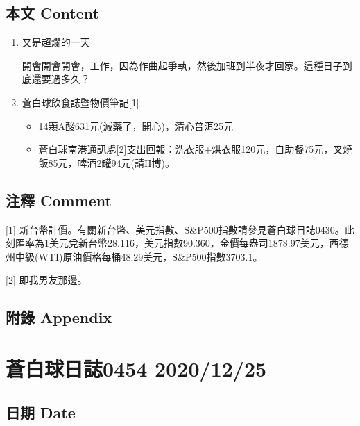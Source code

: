 \documentclass[a5paper, 10pt
]{book}
\providecommand{\tightlist}{%
  \setlength{\itemsep}{0pt}\setlength{\parskip}{0pt}}
\begin{document}
\hypertarget{ux672cux6587-content-23}{%
\subsection{本文 Content}\label{ux672cux6587-content-23}}

\begin{enumerate}
\def\labelenumi{\arabic{enumi}.}
\item
  又是超爛的一天

  開會開會開會，工作，因為作曲起爭執，然後加班到半夜才回家。這種日子到底還要過多久？
\item
  蒼白球飲食誌暨物價筆記{[}1{]}

  \begin{itemize}
  \tightlist
  \item
    14顆A酸631元(減藥了，開心)，清心普洱25元
  \item
    蒼白球南港通訊處{[}2{]}支出回報：洗衣服+烘衣服120元，自助餐75元，叉燒飯85元，啤酒2罐94元(請H博)。
  \end{itemize}
\end{enumerate}

\hypertarget{ux6ce8ux91cb-comment-23}{%
\subsection{注釋 Comment}\label{ux6ce8ux91cb-comment-23}}

{[}1{]}
新台幣計價。有關新台幣、美元指數、S\&P500指數請參見蒼白球日誌0430。此刻匯率為1美元兌新台幣28.116，美元指數90.360，金價每盎司1878.97美元，西德州中級(WTI)原油價格每桶48.29美元，S\&P500指數3703.1。

{[}2{]} 即我男友那邊。

\hypertarget{ux9644ux9304-appendix-23}{%
\subsection{附錄 Appendix}\label{ux9644ux9304-appendix-23}}

\hypertarget{ux84bcux767dux7403ux65e5ux8a8c0454-20201225}{%
\section{蒼白球日誌0454
2020/12/25}\label{ux84bcux767dux7403ux65e5ux8a8c0454-20201225}}

\hypertarget{ux65e5ux671f-date-24}{%
\subsection{日期 Date}\label{ux65e5ux671f-date-24}}
\end{document}
